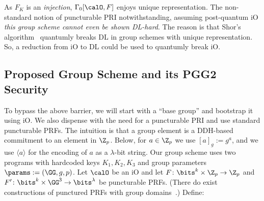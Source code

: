 As $F_K$ is an \emph{injection},  $\Gamma_0[\calO,F]$ enjoys unique representation.
The non-standard notion of puncturable PRI notwithstanding, assuming post-quantum iO  \emph{this group scheme cannot even be shown DL-hard}. The reason is that Shor's algorithm~\cite{FOCS:Shor94} quantumly breaks DL in group schemes with unique representation.  So, a reduction from iO to DL could be used to quantumly break iO. 


\subsection{Proposed Group Scheme  and its PGG2 Security}
To bypass the above barrier, we will start with a ``base group'' and bootstrap it using iO.  We also dispense with the need for a puncturable PRI and use standard puncturable PRFs. The intuition is that a group element is a DDH-based commitment to an element in $\Z_p$.  %
 Below,  for $a \in \Z_p$ we use  $[a]_g := g^a$, and we use $\langle a \rangle$ for the encoding of $a$ as a $\lambda$-bit string. Our group scheme uses two programs with hardcoded keys $K_1,K_2,K_3$ and group parameters $\params := (\GG, g, p)$. Let $\calO$ be an iO and let $F \colon \bits^k \times \Z_p \to \Z_p$ and  $F' \colon \bits^k \times \GG^3 \to \bits^{\lambda}$ be puncturable PRFs. (There do exist constructions of punctured PRFs with group domains~\cite{C:AMNYY18}.) Define:
 
